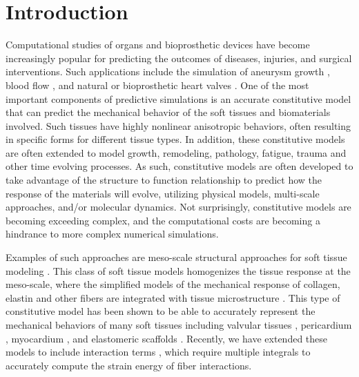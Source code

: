 
\section{Introduction}

	Computational studies of organs and bioprosthetic devices have become increasingly popular for predicting the outcomes of diseases, injuries, and surgical interventions. Such applications include the simulation of aneurysm growth \cite{rissland_abdominal_2009,ramault_comparison_2011,hoi_effects_2004,volokh_model_2008}, blood flow \cite{olufsen_numerical_2000,perktold_computer_1995,pries_blood_1990,oshima_finite_2001,bagchi_mesoscale_2007}, and natural or bioprosthetic heart valves \cite{zakerzadeh_computational_2017, soares_biomechanical_2016, kamensky_immersogeometric_2015, aggarwal_vivo_2016, nobili_numerical_2008, cheng_three_2004}. One of the most important components of predictive simulations is an accurate constitutive model that can predict the mechanical behavior of the soft tissues and biomaterials involved. Such tissues have highly nonlinear anisotropic behaviors, often resulting in specific forms for different tissue types. In addition, these constitutive models are often extended to model growth, remodeling, pathology, fatigue, trauma and other time evolving processes. As such, constitutive models are often developed to take advantage of the structure to function relationship to predict how the response of the materials will evolve, utilizing physical models, multi-scale approaches, and/or molecular dynamics. Not surprisingly, constitutive models are becoming exceeding complex, and the computational costs are becoming a hindrance to more complex numerical simulations. 


	Examples of such approaches are meso-scale structural approaches for soft tissue modeling \cite{lanir_constitutive_1983}. This class of soft tissue models homogenizes the tissue response at the meso-scale, where the simplified models of the mechanical response of collagen, elastin and other fibers are integrated with tissue microstructure \cite{kassab_structure_2016}. This type of constitutive model has been shown to be able to accurately represent the mechanical behaviors of many soft tissues including valvular tissues \cite{zhang_meso_2016, rego_mitral_2016}, pericardium \cite{zhang_modeling_2017}, myocardium \cite{avazmohammadi_novel_2017}, and elastomeric scaffolds \cite{d.amore_large_2016}. Recently, we have extended these models to include interaction terms \cite{zhang_modeling_2017, avazmohammadi_novel_2017}, which require multiple integrals to accurately compute the strain energy of fiber interactions. 





